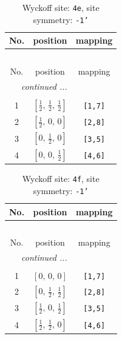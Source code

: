 \documentclass[fleqn,8pt]{jsarticle}
\begin{document}
\begin{longtable}{ccc}
\caption{Wyckoff site: {\tt 4e}, site symmetry: {\tt -1'}}
 \\
 \hline \hline
No. & position & mapping \\ \hline \endfirsthead

\multicolumn{2}{l}{\tablename\ \thetable{}} \\
 \hline \hline
No. & position & mapping \\ \hline \endhead

 \hline \hline
\multicolumn{2}{r}{\footnotesize\it continued ...} \\ \endfoot

 \hline \hline
\multicolumn{2}{r}{} \\ \endlastfoot

1 & $\left[ \frac{1}{2},\, \frac{1}{2},\, \frac{1}{2} \right]$ & {\tt [1,7]} \\ \hline
2 & $\left[ \frac{1}{2},\, 0,\, 0 \right]$ & {\tt [2,8]} \\ \hline
3 & $\left[ 0,\, \frac{1}{2},\, 0 \right]$ & {\tt [3,5]} \\ \hline
4 & $\left[ 0,\, 0,\, \frac{1}{2} \right]$ & {\tt [4,6]} \\
\end{longtable}
\renewcommand{\arraystretch}{1.2}
\begin{longtable}{ccc}
\caption{Wyckoff site: {\tt 4f}, site symmetry: {\tt -1'}}
 \\
 \hline \hline
No. & position & mapping \\ \hline \endfirsthead

\multicolumn{2}{l}{\tablename\ \thetable{}} \\
 \hline \hline
No. & position & mapping \\ \hline \endhead

 \hline \hline
\multicolumn{2}{r}{\footnotesize\it continued ...} \\ \endfoot

 \hline \hline
\multicolumn{2}{r}{} \\ \endlastfoot

1 & $\left[ 0,\, 0,\, 0 \right]$ & {\tt [1,7]} \\ \hline
2 & $\left[ 0,\, \frac{1}{2},\, \frac{1}{2} \right]$ & {\tt [2,8]} \\ \hline
3 & $\left[ \frac{1}{2},\, 0,\, \frac{1}{2} \right]$ & {\tt [3,5]} \\ \hline
4 & $\left[ \frac{1}{2},\, \frac{1}{2},\, 0 \right]$ & {\tt [4,6]} \\
\end{longtable}
\end{document}
